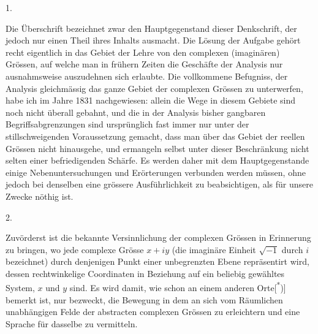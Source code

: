 \clearpage\NoSourceHead{}
\begin{center}1.\end{center}
\noindent\hspace*{\parindent}Die Überschrift bezeichnet zwar den Hauptgegenstand dieser Denkschrift, der jedoch nur einen Theil ihres Inhalts ausmacht. Die Lösung der Aufgabe gehört recht eigentlich in das Gebiet der Lehre von den complexen (imaginären) Grössen, auf welche man in frühern Zeiten die Geschäfte der Analysis nur ausnahmsweise auszudehnen sich erlaubte. Die vollkommene Befugniss, der Analysis gleichmässig das ganze Gebiet der complexen Grössen zu unterwerfen, habe ich im Jahre 1831 nachgewiesen: allein die Wege in diesem Gebiete sind noch nicht überall gebahnt, und die in der Analysis bisher gangbaren Begriffsabgrenzungen sind ursprünglich fast immer nur unter der stillschweigenden Voraussetzung gemacht, dass man über das Gebiet der reellen Grössen nicht hinausgehe, und ermangeln selbst unter dieser Beschränkung nicht selten einer befriedigenden Schärfe. Es werden daher mit dem Hauptgegenstande einige Nebenuntersuchungen und Erörterungen verbunden werden müssen, ohne jedoch bei denselben eine grössere Ausführlichkeit zu beabsichtigen, als für unsere Zwecke nöthig ist.
\begin{center}2.\end{center}
\noindent\hspace*{\parindent}Zuvörderst ist die bekannte Versinnlichung der complexen Grössen in Erinnerung zu bringen, wo jede complexe Grösse \(x+iy\) (die imaginäre Einheit
\clearpage{}
\noindent \(\surd{-1}\) durch \(i\) bezeichnet) durch denjenigen Punkt einer unbegrenzten Ebene repräsentirt wird, dessen rechtwinkelige Coordinaten in Beziehung auf ein beliebig gewähltes System, \(x\) und \(y\) sind. Es wird damit, wie schon an einem anderen Orte[\textsuperscript{*})] bemerkt ist, nur bezweckt, die Bewegung in dem an sich vom Räumlichen unabhängigen Felde der abstracten complexen Grössen zu erleichtern und eine Sprache für dasselbe zu vermitteln.

